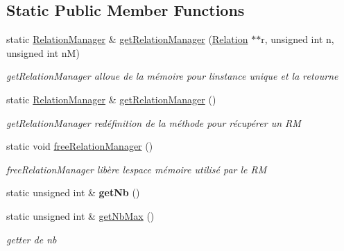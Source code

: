 \subsection*{Static Public Member Functions}
\begin{DoxyCompactItemize}
\item 
static \hyperlink{classRelationManager}{Relation\+Manager} \& \hyperlink{classRelationManager_a82106c99bec406c5e2834992a776c739}{get\+Relation\+Manager} (\hyperlink{classRelation}{Relation} $\ast$$\ast$r, unsigned int n, unsigned int nM)
\begin{DoxyCompactList}\small\item\em get\+Relation\+Manager alloue de la mémoire pour l\textquotesingle{}instance unique et la retourne \end{DoxyCompactList}\item 
\mbox{\label{classRelationManager_a68dcf85c233f99a17dc790692eef02bb}} 
static \hyperlink{classRelationManager}{Relation\+Manager} \& \hyperlink{classRelationManager_a68dcf85c233f99a17dc790692eef02bb}{get\+Relation\+Manager} ()
\begin{DoxyCompactList}\small\item\em get\+Relation\+Manager redéfinition de la méthode pour récupérer un RM \end{DoxyCompactList}\item 
\mbox{\label{classRelationManager_a0905aa5f5e3e7dd971f2d72c93a563c8}} 
static void \hyperlink{classRelationManager_a0905aa5f5e3e7dd971f2d72c93a563c8}{free\+Relation\+Manager} ()
\begin{DoxyCompactList}\small\item\em free\+Relation\+Manager libère l\textquotesingle{}espace mémoire utilisé par le RM \end{DoxyCompactList}\item 
\mbox{\label{classRelationManager_ac415d7de6ef6c243bc17a949ed31995c}} 
static unsigned int \& {\bfseries get\+Nb} ()
\item 
\mbox{\label{classRelationManager_aa1ab693f6378ea9664d2c54cc14898ad}} 
static unsigned int \& \hyperlink{classRelationManager_aa1ab693f6378ea9664d2c54cc14898ad}{get\+Nb\+Max} ()
\begin{DoxyCompactList}\small\item\em getter de nb \end{DoxyCompactList}\item 
$$
\end{DoxyCompactItemize}
